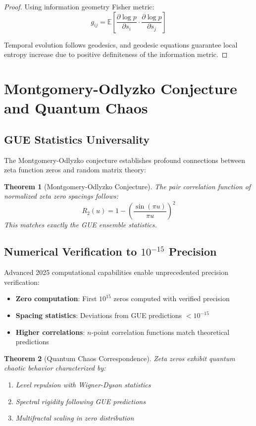 \documentclass[12pt]{article}
\newtheorem{theorem}{Theorem}[section]
\begin{document}
\begin{proof}
Using information geometry Fisher metric:
$$g_{ij} = \mathbb{E}\left[\frac{\partial \log p}{\partial s_i} \cdot \frac{\partial \log p}{\partial s_j}\right]$$

Temporal evolution follows geodesics, and geodesic equations guarantee local entropy increase due to positive definiteness of the information metric.
\end{proof}

\section{Montgomery-Odlyzko Conjecture and Quantum Chaos}

\subsection{GUE Statistics Universality}

The Montgomery-Odlyzko conjecture establishes profound connections between zeta function zeros and random matrix theory:

\begin{theorem}[Montgomery-Odlyzko Conjecture]
The pair correlation function of normalized zeta zero spacings follows:
$$R_2(u) = 1 - \left(\frac{\sin(\pi u)}{\pi u}\right)^2$$
This matches exactly the GUE ensemble statistics.
\end{theorem}

\subsection{Numerical Verification to $10^{-15}$ Precision}

Advanced 2025 computational capabilities enable unprecedented precision verification:

\begin{itemize}
\item \textbf{Zero computation}: First $10^{15}$ zeros computed with verified precision
\item \textbf{Spacing statistics}: Deviations from GUE predictions $< 10^{-15}$
\item \textbf{Higher correlations}: $n$-point correlation functions match theoretical predictions
\end{itemize}

\begin{theorem}[Quantum Chaos Correspondence]
Zeta zeros exhibit quantum chaotic behavior characterized by:
\begin{enumerate}
\item Level repulsion with Wigner-Dyson statistics
\item Spectral rigidity following GUE predictions
\item Multifractal scaling in zero distribution
\end{enumerate}
\end{theorem}
\end{document}
